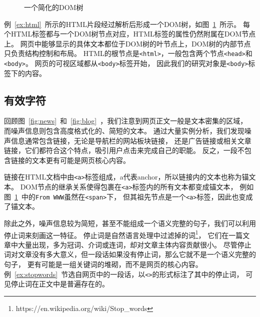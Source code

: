 \begin{figure}[htbp]
\centering
{}
\caption{一个简化的DOM树}
\label{fig:dom}
\end{figure}

例~\ref{ex:html}~所示的HTML片段经过解析后形成一个DOM树，如图~\ref{fig:dom}~所示。
每个HTML标签都与一个DOM树节点对应，HTML标签的属性仍然附属在DOM节点上。
网页中能够显示的具体文本都位于DOM树的叶节点上，DOM树的内部节点只负责结构控制和布局。
HTML的根节点是\texttt{<html>}，一般包含两个节点\texttt{<head>}和\texttt{<body>}。
网页的可视区域都从\texttt{<body>}标签开始，
因此我们的研究对象是\texttt{<body>}标签下的内容。

\subsection{有效字符}
回顾图~\ref{fig:news}~和~\ref{fig:blog}~，我们注意到网页正文一般是文本密集的区域，
而噪声信息则包含高度格式化的、简短的文本。
通过大量实例分析，我们发现噪声信息通常包含链接，无论是导航栏的网站板块链接，
还是广告链接或相关文章链接，它们都符合这个特点，吸引用户点击来完成自己的职能。
反之，一段不包含链接的文本更有可能是网页核心内容。

链接在HTML文档中由\texttt{<a>}标签组成，a代表anchor，所以链接内的文本也称为锚文本。
DOM节点的继承关系使得包裹在\texttt{<a>}标签内的所有文本都变成锚文本，
例如图~\ref{fig:dom}~中的\texttt{From WWW}虽然在\texttt{<span>}下，
但其祖先节点是一个\texttt{<a>}标签，因此也变成了锚文本。

除此之外，噪声信息较为简短，甚至不能组成一个语义完整的句子，我们可以利用停止词来刻画这一特征。
停止词是自然语言处理中过滤掉的词\footnote{https://en.wikipedia.org/wiki/Stop\_words}，
它们在一篇文章中大量出现，多为冠词、介词或连词，却对文章主体内容贡献很小。
尽管停止词对文章没有多大意义，但一段话如果没有停止词，那么它就不是一个语义完整的句子，
更有可能是一组关键词的堆砌，而不是网页的核心内容。
例~\ref{ex:stopwords}~节选自网页中的一段话，以\texttt{<>}的形式标注了其中的停止词，
可见停止词在正文中是普遍存在的。

